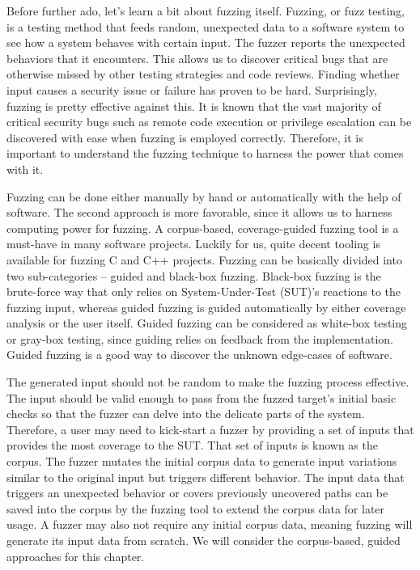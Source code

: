 Before further ado, let's learn a bit about fuzzing itself. Fuzzing, or fuzz testing, is a testing method that feeds random, unexpected data to a software system to see how a system behaves with certain input. The fuzzer reports the unexpected behaviors that it encounters. This allows us to discover critical bugs that are otherwise missed by other testing strategies and code reviews. Finding whether input causes a security issue or failure has proven to be hard. Surprisingly, fuzzing is pretty effective against this. It is known that the vast majority of critical security bugs such as remote code execution or privilege escalation can be discovered with ease when fuzzing is employed correctly. Therefore, it is important to understand the fuzzing technique to harness the power that comes with it.

Fuzzing can be done either manually by hand or automatically with the help of software. The second approach is more favorable, since it allows us to harness computing power for fuzzing. A corpus-based, coverage-guided fuzzing tool is a must-have in many software projects. Luckily for us, quite decent tooling is available for fuzzing C and C++ projects. Fuzzing can be basically divided into two sub-categories – guided and black-box fuzzing. Black-box fuzzing is the brute-force way that only relies on System-Under-Test (SUT)'s reactions to the fuzzing input, whereas guided fuzzing is guided automatically by either coverage analysis or the user itself. Guided fuzzing can be considered as white-box testing or gray-box testing, since guiding relies on feedback from the implementation. Guided fuzzing is a good way to discover the unknown edge-cases of software.

The generated input should not be random to make the fuzzing process effective. The input should be valid enough to pass from the fuzzed target's initial basic checks so that the fuzzer can delve into the delicate parts of the system. Therefore, a user may need to kick-start a fuzzer by providing a set of inputs that provides the most coverage to the SUT. That set of inputs is known as the corpus. The fuzzer mutates the initial corpus data to generate input variations similar to the original input but triggers different behavior. The input data that triggers an unexpected behavior or covers previously uncovered paths can be saved into the corpus by the fuzzing tool to extend the corpus data for later usage. A fuzzer may also not require any initial corpus data, meaning fuzzing will generate its input data from scratch. We will consider the corpus-based, guided approaches for this chapter.

